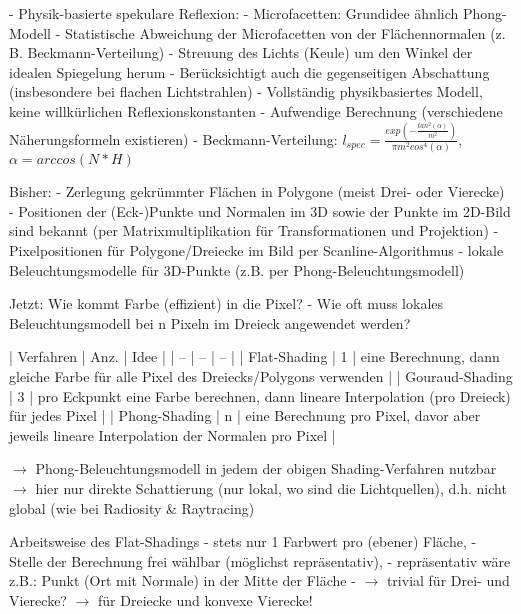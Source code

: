 \documentclass[10pt,landscape]{article}
\makeatletter
\renewcommand{\section}{\@startsection{section}{1}{0mm}%
                                {-1ex plus -.5ex minus -.2ex}%
                                {0.5ex plus .2ex}%
                                {\normalfont\large\bfseries}}
\renewcommand{\subsection}{\@startsection{subsection}{2}{0mm}%
                                {-1explus -.5ex minus -.2ex}%
                                {0.5ex plus .2ex}%
                                {\normalfont\normalsize\bfseries}}
\makeatother
\begin{document}
\begin{multicols}{3}
  - Physik-basierte spekulare Reflexion:
  - Microfacetten: Grundidee ähnlich Phong-Modell
  - Statistische Abweichung der Microfacetten von der Flächennormalen (z. B. Beckmann-Verteilung)
  - Streuung des Lichts (Keule) um den Winkel der idealen Spiegelung herum
  - Berücksichtigt auch die gegenseitigen Abschattung (insbesondere bei flachen Lichtstrahlen)
  - Vollständig physikbasiertes Modell, keine willkürlichen Reflexionskonstanten
  - Aufwendige Berechnung (verschiedene Näherungsformeln existieren)
  - Beckmann-Verteilung: $l_{spec}=\frac{exp(-\frac{tan^2(\alpha)}{m^2})}{\pi m^2 cos^4 (\alpha)}$, $\alpha=arccos(N*H)$
  
  Bisher:
  - Zerlegung gekrümmter Flächen in Polygone (meist Drei- oder Vierecke)
  - Positionen der (Eck-)Punkte und Normalen im 3D sowie der Punkte im 2D-Bild sind bekannt (per Matrixmultiplikation für Transformationen und Projektion)
  - Pixelpositionen für Polygone/Dreiecke im Bild per Scanline-Algorithmus
  - lokale Beleuchtungsmodelle für 3D-Punkte (z.B. per Phong-Beleuchtungsmodell)
  
  Jetzt: Wie kommt Farbe (effizient) in die Pixel?
  - Wie oft muss lokales Beleuchtungsmodell bei n Pixeln im Dreieck angewendet werden?
  
  | Verfahren  | Anz. | Idee |
  | -- | -- | -- |
  | Flat-Shading | 1 | eine Berechnung, dann gleiche Farbe für alle Pixel des Dreiecks/Polygons verwenden |
  | Gouraud-Shading | 3 | pro Eckpunkt eine Farbe berechnen, dann lineare Interpolation (pro Dreieck) für jedes Pixel |
  | Phong-Shading | n | eine Berechnung pro Pixel, davor aber jeweils lineare Interpolation der Normalen pro Pixel |
  
  $\rightarrow$ Phong-Beleuchtungsmodell in jedem der obigen Shading-Verfahren nutzbar
  $\rightarrow$ hier nur direkte Schattierung (nur lokal, wo sind die Lichtquellen), d.h. nicht global (wie bei Radiosity \& Raytracing)
  
  Arbeitsweise des Flat-Shadings
  - stets nur 1 Farbwert pro (ebener) Fläche,
  - Stelle der Berechnung frei wählbar (möglichst repräsentativ),
  - repräsentativ wäre z.B.: Punkt (Ort mit Normale) in der Mitte der Fläche
  - $\rightarrow$ trivial für Drei- und Vierecke? $\rightarrow$ für Dreiecke und konvexe Vierecke!
  

\end{multicols}
\end{document}
